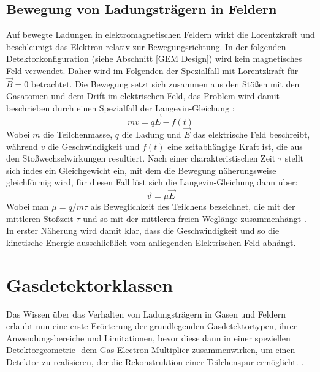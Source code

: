 		\subsection{Bewegung von Ladungsträgern in Feldern}\label{sec:Bewegung in Feldern}
		Auf bewegte Ladungen in elektromagnetischen Feldern wirkt die Lorentzkraft und beschleunigt das Elektron relativ zur Bewegungsrichtung. In der folgenden Detektorkonfiguration (siehe Abschnitt [GEM Design]) wird kein magnetisches Feld verwendet. Daher wird im Folgenden der Spezialfall mit Lorentzkraft für $\vec{B}=0$ betrachtet. Die Bewegung setzt sich zusammen aus den Stößen mit den Gasatomen und dem Drift im elektrischen Feld, das Problem wird damit beschrieben durch einen Spezialfall der Langevin-Gleichung \cite{Schwabl}:
		\begin{equation*}
			m \dot{v}= q \vec{E}- f(t)
		\end{equation*}
		Wobei $m$ die Teilchenmasse, $q$ die Ladung und $\vec{E}$ das elektrische Feld beschreibt, während $v$ die Geschwindigkeit und $f(t)$ eine zeitabhängige Kraft ist, die aus den Stoßwechselwirkungen resultiert. Nach einer charakteristischen Zeit $\tau$ stellt sich indes ein Gleichgewicht ein, mit dem die Bewegung näherungsweise gleichförmig wird, für diesen Fall löst sich die Langevin-Gleichung dann über:
		\begin{equation*}
			\vec{v}= \mu \vec{E}
		\end{equation*}
		Wobei man $\mu=q/m \tau$ als Beweglichkeit des Teilchens bezeichnet, die mit der mittleren Stoßzeit $\tau$ und so mit der mittleren freien Weglänge zusammenhängt \cite{ottnad}. In erster Näherung wird damit klar, dass die Geschwindigkeit und so die kinetische Energie ausschließlich vom anliegenden Elektrischen Feld abhängt.
		
		\newpage
	\section{Gasdetektorklassen}
		Das Wissen über das Verhalten von Ladungsträgern in Gasen und Feldern erlaubt nun eine erste Erörterung der grundlegenden Gasdetektortypen, ihrer Anwendungsbereiche und Limitationen, bevor diese dann in einer speziellen Detektorgeometrie- dem Gas Electron Multiplier zusammenwirken, um einen Detektor zu realisieren, der die Rekonstruktion einer Teilchenspur ermöglicht.   \cite{Leo}.
		
